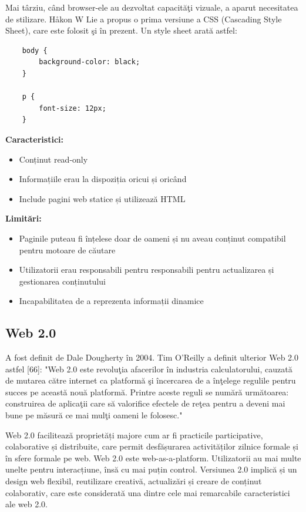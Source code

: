 \documentclass[12pt, a4paper]{report}
\begin{document}
Mai t\^ arziu, c\^ and browser-ele au dezvoltat capacit\u a\c ti vizuale, a aparut necesitatea de stilizare. Håkon W Lie a propus o prima versiune a CSS (Cascading Style Sheet), care este folosit \c si \^ in prezent. Un style sheet arat\u a astfel:
\begin{lstlisting}
	body {
		background-color: black;
	}

	p {
		font-size: 12px;
	}
\end{lstlisting}

\newpage
\textbf{Caracteristici:}
\begin{itemize}
	\item Conținut read-only
	\item Informațiile erau la dispoziția oricui și oricând
	\item Include pagini web statice și utilizează HTML
\end{itemize}


\textbf{Limitări:}
\begin{itemize}
	\item Paginile puteau fi înțelese doar de oameni și nu aveau conținut compatibil pentru motoare de căutare
	\item Utilizatorii erau responsabili pentru responsabili pentru actualizarea și gestionarea conținutului
	\item Incapabilitatea de a reprezenta informații dinamice
\end{itemize}

\subsection{Web 2.0}

A fost definit de Dale Dougherty în 2004. Tim O'Reilly a definit ulterior Web 2.0 astfel [66]:
"Web 2.0 este revolu\c tia afacerilor \^ in industria calculatorului, cauzat\u a de mutarea c\u atre internet ca platform\u a \c si \^ incercarea de a \^ in\c telege regulile pentru succes pe aceast\u a nou\u a platform\u a. Printre aceste reguli se num\u ar\u a urm\u atoarea: construirea de aplica\c tii care s\u a valorifice efectele de re\c tea pentru a deveni mai bune pe m\u asur\u a ce mai mul\c ti oameni le folosesc."

Web 2.0 facilitează proprietăți majore cum ar fi practicile participative, colaborative și distribuite, care permit desfășurarea activităților zilnice formale și în sfere formale pe web. Web 2.0 este web-as-a-platform. Utilizatorii au mai multe unelte pentru interacțiune, însă cu mai puțin control. Versiunea 2.0 implică și un design web flexibil, reutilizare creativă, actualizări și creare de conținut colaborativ, care este considerată una dintre cele mai remarcabile caracteristici ale web 2.0.
\end{document}

